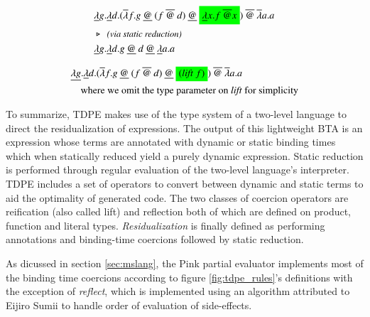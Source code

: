 \documentclass[a4paper,12pt,twoside,openright]{report}
\theoremstyle{definition}
\begin{document}
\begin{figure}[htp!]
    \begin{align}
        & \underline{\lambda}g.\underline{\lambda} d.(\overline{\lambda}f.g \: \underline{@} \: (f \: \overline{@} \: d) \: \underline{@} \: \text{\colorbox{green}{$\underline{\lambda} x.f \: \overline{@} x$}}) \: \overline{@} \: \overline{\lambda} a.a \label{eq:tdpe_ex3a} \\
        & \triangleright \:\: \emph{\small{\text{(via static reduction)}}} \nonumber \\
        & \underline{\lambda}g.\underline{\lambda} d.g \: \underline{@} \: d \: \underline{@} \: \underline{\lambda} a.a \label{eq:tdpe_ex3b}
    \end{align}
\end{figure}

\begin{figure}[htp!]
    \begin{align}
        & \underline{\lambda g}.\underline{\lambda} d.(\overline{\lambda}f.g \: \underline{@} \: (f \: \overline{@} \: d) \: \underline{@} \: \text{\colorbox{green}{(\textit{lift} $f$)}}) \: \overline{@} \: \overline{\lambda} a.a \label{eq:tdpe_ex4} \\
        & \quad \text{where we omit the type parameter on \textit{lift} for simplicity} \nonumber
    \end{align}
\end{figure}

To summarize, TDPE makes use of the type system of a two-level language to direct the residualization of expressions. The output of this lightweight BTA is an expression whose terms are annotated with dynamic or static binding times which when statically reduced yield a purely dynamic expression. Static reduction is performed through regular evaluation of the two-level language's interpreter. TDPE includes a set of operators to convert between dynamic and static terms to aid the optimality of generated code. The two classes of coercion operators are reification (also called lift) and reflection both of which are defined on product, function and literal types. \textit{Residualization} is finally defined as performing annotations and binding-time coercions followed by static reduction.

As dicussed in section \ref{sec:mslang}, the Pink \cite{amin2017collapsing} partial evaluator implements most of the binding time coercions according to figure \ref{fig:tdpe_rules}'s definitions with the exception of \textit{reflect}, which is implemented using an algorithm attributed to Eijiro Sumii \cite{hatcliff2007partial} to handle order of evaluation of side-effects.
\end{document}
